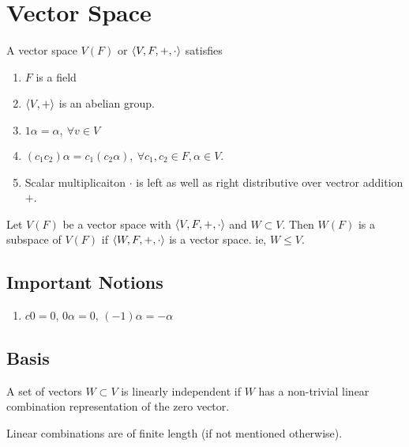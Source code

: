 \section{Vector Space}
\begin{definition}
	A vector space $V(F)$ or $\left\langle V,F,+,\cdot \right\rangle$ satisfies
	\begin{enumerate}
		\item $F$ is a field
		\item $\left\langle V,+ \right\rangle$ is an abelian group.
		\item $1\alpha=\alpha,\ \forall v \in V$
		\item $(c_1c_2)\alpha = c_1 (c_2\alpha),\ \forall c_1,c_2 \in F, \alpha \in V$.
		\item Scalar multiplicaiton $\cdot$ is left as well as right distributive over vectror addition $+$.
	\end{enumerate}
\end{definition}

\begin{definition}[subspace]
	Let $V(F)$ be a vector space with $\left\langle V,F,+,\cdot \right\rangle$ and $W \subset V$.
	Then $W(F)$ is a subspace of $V(F)$ if $\left\langle W,F,+,\cdot \right\rangle$ is a vector space.
	ie, $W \le V$.
\end{definition}

\subsection{Important Notions}
\begin{enumerate}
	\item $c0 = 0$, $0\alpha = 0$, $(-1)\alpha = -\alpha$
\end{enumerate}

\subsection{Basis}
\begin{definition}
	A set of vectors $W \subset V$ is linearly independent if $W$ has a non-trivial linear combination representation of the zero vector.
\end{definition}
\begin{note}
	Linear combinations are of finite length (if not mentioned otherwise).
\end{note}

